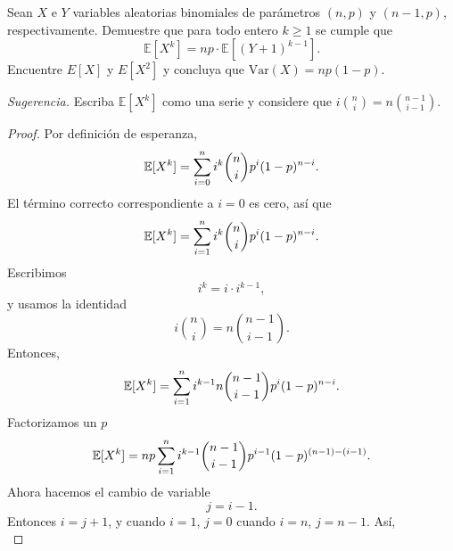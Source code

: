 \documentclass[12pt,a4paper]{article}
\begin{document}
    \begin{mdframed}[style=mdpinkbox, frametitle={Ejercicio 3}]
        Sean $X$ e $Y$ variables aleatorias binomiales de parámetros $(n, p)$ y $(n-1, p)$,
        respectivamente. Demuestre que para todo entero $k \geq 1$ se cumple que
        \begin{equation*}
            \mathbb{E}[X^k] = np \cdot \mathbb{E}[(Y+1)^{k-1}].
        \end{equation*}
        Encuentre $E[X]$ y $E[X^2]$ y concluya que $\mathrm{Var}(X) = np(1-p)$.

        \medskip
        \noindent\textit{Sugerencia.} Escriba $\mathbb{E}[X^k]$ como una serie y considere que
        $i\binom{n}{i} = n\binom{n-1}{i-1}$.
    \end{mdframed}

    \begin{proof}
        Por definición de esperanza,
        \begin{equation*}
            \mathbb{E}[X^{k}]=\sum_{i=0}^{n}i^{k}\binom{n}{i}p^{i}(1-p)^{n-i}.
        \end{equation*}
        El término correcto correspondiente a $i=0$ es cero, así que
        \begin{equation*}
            \mathbb{E}[X^{k}]=\sum_{i=1}^{n}i^{k}\binom{n}{i}p^{i}(1-p)^{n-i}.
        \end{equation*}
        Escribimos
        \begin{equation*}
            i^{k}=i\cdot i^{k-1},
        \end{equation*}
        y usamos la identidad
        \begin{equation*}
            i\binom{n}{i}=n\binom{n-1}{i-1}.
        \end{equation*}
        Entonces,
        \begin{equation*}
            \mathbb{E}[X^{k}]=\sum_{i=1}^{n}i^{k-1}n\binom{n-1}{i-1}p^{i}(1-p)^{n-i}.
        \end{equation*}
        Factorizamos un $p$
        \begin{equation*}
            \mathbb{E}[X^{k}]=np\sum_{i=1}^{n}i^{k-1}\binom{n-1}{i-1}p^{i-1}(1-p)^{(n-1)-(i-1)}.
        \end{equation*}
        Ahora hacemos el cambio de variable
        \begin{equation*}
            j=i-1.
        \end{equation*}
        Entonces $i=j+1$, y cuando $i=1$, $j=0$ cuando $i=n$, $j=n-1$. Así,
        \begin{equation*}

\end{equation*}
\end{proof}
\end{document}
